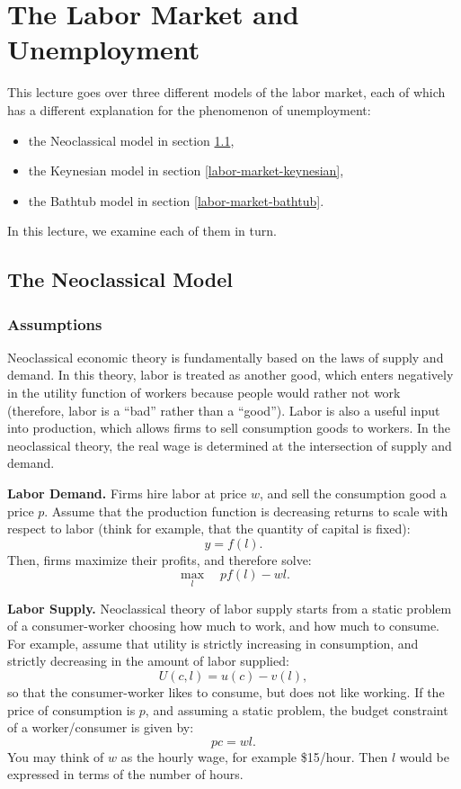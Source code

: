 \documentclass[]{book}
\providecommand{\tightlist}{%
  \setlength{\itemsep}{0pt}\setlength{\parskip}{0pt}}
\theoremstyle{definition}
\theoremstyle{definition}
\theoremstyle{definition}
\theoremstyle{remark}
\begin{document}
\hypertarget{labor-market}{\chapter{The Labor Market and
Unemployment}\label{labor-market}}

This lecture goes over three different models of the labor market, each
of which has a different explanation for the phenomenon of unemployment:

\begin{itemize}
\tightlist
\item
  the Neoclassical model in section \ref{labor-market-neoclassical},
\item
  the Keynesian model in section \ref{labor-market-keynesian},
\item
  the Bathtub model in section \ref{labor-market-bathtub}.
\end{itemize}

In this lecture, we examine each of them in turn.

\section{The Neoclassical Model}\label{labor-market-neoclassical}

\subsection{Assumptions}\label{assumptions-2}

Neoclassical economic theory is fundamentally based on the laws of
supply and demand. In this theory, labor is treated as another good,
which enters negatively in the utility function of workers because
people would rather not work (therefore, labor is a ``bad'' rather than
a ``good''). Labor is also a useful input into production, which allows
firms to sell consumption goods to workers. In the neoclassical theory,
the real wage is determined at the intersection of supply and demand.

\textbf{Labor Demand.} Firms hire labor at price \(w\), and sell the
consumption good a price \(p\). Assume that the production function is
decreasing returns to scale with respect to labor (think for example,
that the quantity of capital is fixed): \[y = f(l).\] Then, firms
maximize their profits, and therefore solve:
\[\max_l \quad pf(l) - wl.\]

\textbf{Labor Supply.} Neoclassical theory of labor supply starts from a
static problem of a consumer-worker choosing how much to work, and how
much to consume. For example, assume that utility is strictly increasing
in consumption, and strictly decreasing in the amount of labor supplied:
\[U(c, l)=u(c)-v(l),\] so that the consumer-worker likes to consume, but
does not like working. If the price of consumption is \(p\), and
assuming a static problem, the budget constraint of a worker/consumer is
given by: \[pc = wl.\] You may think of \(w\) as the hourly wage, for
example \$15/hour. Then \(l\) would be expressed in terms of the number
of hours.
\end{document}
